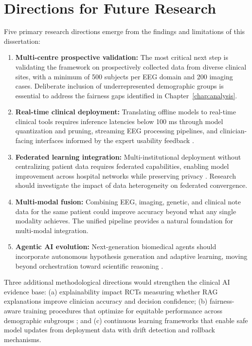 \section{Directions for Future Research}
\label{sec:future_research}

Five primary research directions emerge from the findings and limitations of this dissertation:

\begin{enumerate}
    \item \textbf{Multi-centre prospective validation:} The most critical next step is validating the framework on prospectively collected data from diverse clinical sites, with a minimum of 500 subjects per EEG domain and 200 imaging cases. Deliberate inclusion of underrepresented demographic groups is essential to address the fairness gaps identified in Chapter~\ref{chap:analysis}.

    \item \textbf{Real-time clinical deployment:} Translating offline models to real-time clinical tools requires inference latencies below 100 ms through model quantization and pruning, streaming EEG processing pipelines, and clinician-facing interfaces informed by the expert usability feedback \citep{rajkomar2019healthcare}.

    \item \textbf{Federated learning integration:} Multi-institutional deployment without centralizing patient data requires federated capabilities, enabling model improvement across hospital networks while preserving privacy \citep{rieke2020federated}. Research should investigate the impact of data heterogeneity on federated convergence.

    \item \textbf{Multi-modal fusion:} Combining EEG, imaging, genetic, and clinical note data for the same patient could improve accuracy beyond what any single modality achieves. The unified pipeline provides a natural foundation for multi-modal integration.

    \item \textbf{Agentic AI evolution:} Next-generation biomedical agents should incorporate autonomous hypothesis generation and adaptive learning, moving beyond orchestration toward scientific reasoning \citep{wang2024agentai}.
\end{enumerate}

Three additional methodological directions would strengthen the clinical AI evidence base: (a) explainability impact RCTs measuring whether RAG explanations improve clinician accuracy and decision confidence; (b) fairness-aware training procedures that optimize for equitable performance across demographic subgroups \citep{char2018ethics}; and (c) continuous learning frameworks that enable safe model updates from deployment data with drift detection and rollback mechanisms.

